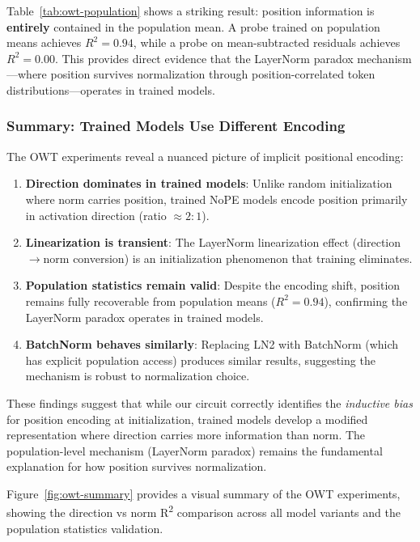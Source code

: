 \documentclass[11pt]{article}
\begin{document}
Table~\ref{tab:owt-population} shows a striking result: position information is \textbf{entirely} contained in the population mean. A probe trained on population means achieves $R^2 = 0.94$, while a probe on mean-subtracted residuals achieves $R^2 = 0.00$. This provides direct evidence that the LayerNorm paradox mechanism---where position survives normalization through position-correlated token distributions---operates in trained models.

\subsubsection{Summary: Trained Models Use Different Encoding}

The OWT experiments reveal a nuanced picture of implicit positional encoding:

\begin{enumerate}
    \item \textbf{Direction dominates in trained models}: Unlike random initialization where norm carries position, trained NoPE models encode position primarily in activation direction (ratio $\approx 2:1$).

    \item \textbf{Linearization is transient}: The LayerNorm linearization effect (direction$\rightarrow$norm conversion) is an initialization phenomenon that training eliminates.

    \item \textbf{Population statistics remain valid}: Despite the encoding shift, position remains fully recoverable from population means ($R^2 = 0.94$), confirming the LayerNorm paradox operates in trained models.

    \item \textbf{BatchNorm behaves similarly}: Replacing LN2 with BatchNorm (which has explicit population access) produces similar results, suggesting the mechanism is robust to normalization choice.
\end{enumerate}

These findings suggest that while our circuit correctly identifies the \textit{inductive bias} for position encoding at initialization, trained models develop a modified representation where direction carries more information than norm. The population-level mechanism (LayerNorm paradox) remains the fundamental explanation for how position survives normalization.

Figure~\ref{fig:owt-summary} provides a visual summary of the OWT experiments, showing the direction vs norm R\textsuperscript{2} comparison across all model variants and the population statistics validation.
\end{document}
